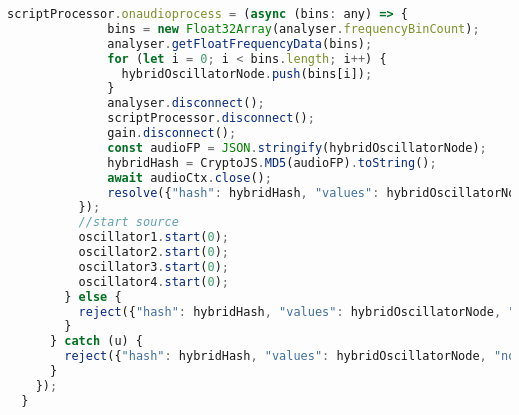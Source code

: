 \begin{lstlisting}[language=JavaScript, caption=Channel Merge Hybrid fingerprint generation code, label=channelMergeHybridFingerprintGenerationCode]
          scriptProcessor.onaudioprocess = (async (bins: any) => {
              bins = new Float32Array(analyser.frequencyBinCount);
              analyser.getFloatFrequencyData(bins);
              for (let i = 0; i < bins.length; i++) {
                hybridOscillatorNode.push(bins[i]);
              }
              analyser.disconnect();
              scriptProcessor.disconnect();
              gain.disconnect();
              const audioFP = JSON.stringify(hybridOscillatorNode);
              hybridHash = CryptoJS.MD5(audioFP).toString();
              await audioCtx.close();
              resolve({"hash": hybridHash, "values": hybridOscillatorNode, "noFingerprint": false});
          });
          //start source
          oscillator1.start(0);
          oscillator2.start(0);
          oscillator3.start(0);
          oscillator4.start(0);
        } else {
          reject({"hash": hybridHash, "values": hybridOscillatorNode, "noFingerprint": true});
        }
      } catch (u) {
        reject({"hash": hybridHash, "values": hybridOscillatorNode, "noFingerprint": true});
      }
    });
  }
\end{lstlisting}

